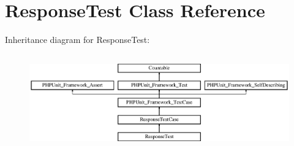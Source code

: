 \section{Response\+Test Class Reference}
\label{class_symfony_1_1_component_1_1_http_foundation_1_1_tests_1_1_response_test}
Inheritance diagram for Response\+Test\+:\begin{figure}[H]
\begin{center}
\leavevmode
\includegraphics[height=4.129793cm]{class_symfony_1_1_component_1_1_http_foundation_1_1_tests_1_1_response_test}
\end{center}
\end{figure}
